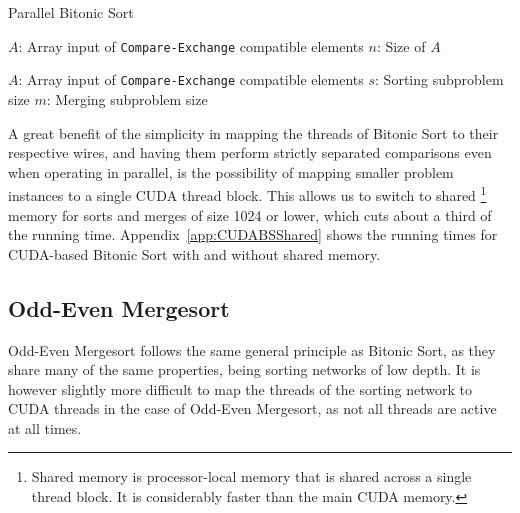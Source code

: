 \begin{algorithm}
\caption{Parallel Bitonic Sort}\label{alg:ParallelBitonic}
\begin{algorithmic}[1]
	\Statex $A$: Array input of \texttt{Compare-Exchange} compatible elements
	\Statex $n$: Size of $A$
 
	 
	\EndFor
\EndFor
\EndProcedure

\item[]

	\Statex $A$: Array input of \texttt{Compare-Exchange} compatible elements
	\Statex $s$: Sorting subproblem size
	\Statex $m$: Merging subproblem size
 
 
\Else
\EndIf
\EndProcedure
\end{algorithmic}
\end{algorithm}

A great benefit of the simplicity in mapping the threads of Bitonic Sort to their respective wires, and having them perform strictly separated comparisons even when operating in parallel, is the possibility of mapping smaller problem instances to a single CUDA thread block. This allows us to switch to shared \footnote{
Shared memory is processor-local memory that is shared across a single thread block. It is considerably faster than the main CUDA memory.
} memory for sorts and merges of size 1024 or lower, which cuts about a third of the running time. Appendix~\ref{app:CUDABSShared} shows the running times for CUDA-based Bitonic Sort with and without shared memory.

\subsection{Odd-Even Mergesort}

Odd-Even Mergesort follows the same general principle as Bitonic Sort, as they share many of the same properties, being sorting networks of low depth. It is however slightly more difficult to map the threads of the sorting network to CUDA threads in the case of Odd-Even Mergesort, as not all threads are active at all times.

